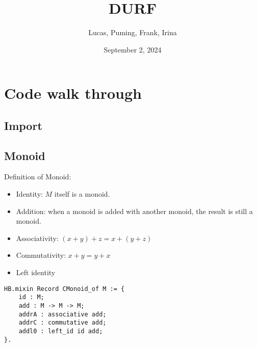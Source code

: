 \documentclass[a4paper,10pt]{article} %
\title{DURF}
\author{Lucas, Puming, Frank, Irina}
\date{September 2, 2024}
\begin{document}
\maketitle

\section{Code walk through}
\subsection{Import}
\subsection{Monoid}
Definition of Monoid:
\begin{itemize}
    \item Identity: \(M\) itself is a monoid.
    \item Addition: when a monoid is added with another monoid, the result is still a monoid.
    \item Associativity: \((x + y) + z = x + (y + z)\)
    \item Commutativity: \(x + y = y + x\)
    \item Left identity
\end{itemize}

\begin{lstlisting}
HB.mixin Record CMonoid_of M := {
    id : M;
    add : M -> M -> M;
    addrA : associative add;
    addrC : commutative add;
    addl0 : left_id id add;
}.
\end{lstlisting}
\end{document}
